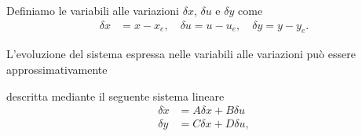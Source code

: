 \documentclass[a4paper, 11pt]{article}
\begin{document}
Definiamo le variabili alle variazioni $\delta x$, $\delta u$ e $\delta y$ come 
%
\begin{align*}
	\delta x &= x-x_e, 
	\quad
	\delta u = u-u_e, 
	\quad
	\delta y = y-y_e.
\end{align*}
%

L'evoluzione del sistema espressa nelle variabili alle variazioni pu\`o essere approssimativamente 

descritta mediante il seguente sistema lineare
%
\begin{subequations}\label{eq:linearized_system}
\begin{align}
	\delta \dot{x} &= A\delta x + B\delta u
	\\
	\delta y &= C\delta x + D\delta u,
\end{align}
\end{subequations}
%
\end{document}
